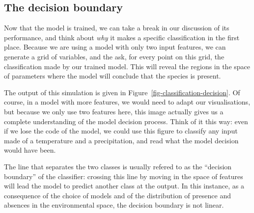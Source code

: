 \documentclass[
  letterpaper,
]{scrbook}
\begin{document}
\subsection{The decision boundary}\label{the-decision-boundary}

Now that the model is trained, we can take a break in our discussion of
its performance, and think about \emph{why} it makes a specific
classification in the first place. Because we are using a model with
only two input features, we can generate a grid of variables, and the
ask, for every point on this grid, the classification made by our
trained model. This will reveal the regions in the space of parameters
where the model will conclude that the species is present.

{
\makeatletter
\def\LT@makecaption#1#2#3{%
  \noalign{\smash{\hbox{\kern\textwidth\rlap{\kern\marginparsep
  \parbox[t]{\marginparwidth}{%
    \footnotesize{%
      \vspace{(1.1\baselineskip)}
    #1{#2: }\ignorespaces #3}}}}}}%
    }
\makeatother

\begin{figure}[bt]



\end{figure}%

}

The output of this simulation is given in
Figure~\ref{fig-classification-decision}. Of course, in a model with
more features, we would need to adapt our visualisations, but because we
only use two features here, this image actually gives us a complete
understanding of the model decision process. Think of it this way: even
if we lose the code of the model, we could use this figure to classify
any input made of a temperature and a precipitation, and read what the
model decision would have been.

The line that separates the two classes is usually refered to as the
``decision boundary'' of the classifier: crossing this line by moving in
the space of features will lead the model to predict another class at
the output. In this instance, as a consequence of the choice of models
and of the distribution of presence and absences in the environmental
space, the decision boundary is not linear.
\end{document}
